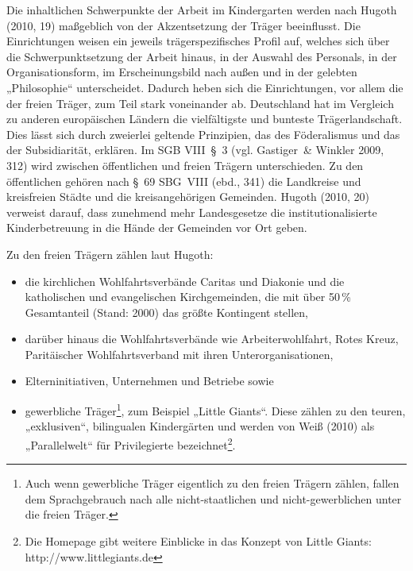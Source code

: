 Die inhaltlichen Schwerpunkte der Arbeit im Kindergarten werden nach Hugoth (2010, 19) maßgeblich von der Akzentsetzung der Träger beeinflusst. Die Einrichtungen weisen ein jeweils trägerspezifisches Profil auf, welches sich über die Schwerpunktsetzung der Arbeit hinaus, in der Auswahl des Personals, in der Organisationsform, im Erscheinungsbild nach außen und in der gelebten „Philosophie“ unterscheidet. Dadurch heben sich die Einrichtungen, vor allem die der freien Träger, zum Teil stark voneinander ab. Deutschland hat im Vergleich zu anderen europäischen Ländern die vielfältigste und bunteste Trägerlandschaft. Dies lässt sich durch zweierlei geltende Prinzipien, das des Föderalismus und das der Subsidiarität, erklären. Im SGB VIII~§~3 (vgl. Gastiger~\& Winkler 2009, 312) wird zwischen öffentlichen und freien Trägern unterschieden. Zu den öffentlichen gehören nach §~69 SBG~VIII (ebd., 341) die Landkreise und kreisfreien Städte und die kreisangehörigen Gemeinden. Hugoth (2010, 20) verweist darauf, dass zunehmend mehr Landesgesetze die institutionalisierte Kinderbetreuung in die Hände der Gemeinden vor Ort geben. 

Zu den freien Trägern zählen laut Hugoth: 

\begin{itemize}
\item die kirchlichen Wohlfahrtsverbände Caritas und Diakonie und die katholischen und evangelischen Kirchgemeinden, die mit über 50\,\%
Gesamtanteil (Stand: 2000) das größte Kontingent stellen, 
\item darüber hinaus die Wohlfahrtsverbände wie Arbeiterwohlfahrt, Rotes Kreuz, Paritäischer Wohlfahrtsverband mit ihren Unterorganisationen,
\item Elterninitiativen, Unternehmen und Betriebe sowie
\item gewerbliche Träger\footnote{Auch wenn gewerbliche Träger eigentlich zu den freien Trägern zählen, fallen dem Sprachgebrauch nach alle nicht-staatlichen und nicht-gewerblichen unter die freien Träger.}, zum Beispiel „Little Giants“. Diese zählen zu den teuren, „exklusiven“, bilingualen Kindergärten und werden von Weiß (2010) als „Parallelwelt“ für Privilegierte bezeichnet\footnote{Die Homepage gibt weitere Einblicke in das Konzept von Little Giants: http://www.littlegiants.de}.      
\end{itemize}

